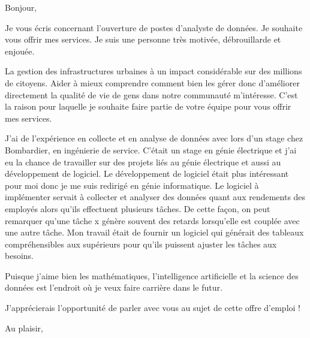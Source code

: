 \documentclass[12pt,french]{letter}
\begin{document}
\pagestyle{headings}

\begin{letter}{}
\address{Montréal, Canada}

\opening{Bonjour,}


Je vous écris concernant l'ouverture de postes d’analyste de données. Je souhaite vous offrir mes services.
Je suis une personne très motivée, débrouillarde et enjouée. 

La gestion des infrastructures urbaines à un impact considérable sur des millions de citoyens. Aider à mieux comprendre comment bien les gérer donc d'améliorer directement la qualité de vie de gens dans notre communauté m'intéresse.  C'est la raison pour laquelle je souhaite faire partie de votre équipe pour vous offrir mes services.

J'ai de l'expérience en collecte et en analyse de données avec lors d'un stage chez Bombardier, en ingénierie de service. C'était un stage en génie électrique et j'ai eu la chance de travailler sur des projets liés au génie électrique et aussi au développement de logiciel. Le développement de logiciel était plus intéressant pour moi donc je me suis redirigé en génie informatique. Le logiciel à implémenter servait à collecter et analyser des données quant aux rendements des employés alors qu'ils effectuent plusieurs tâches. De cette façon, on peut remarquer qu'une tâche x génère souvent des retards lorsqu'elle est couplée avec une autre tâche. Mon travail était de fournir un logiciel qui générait des tableaux compréhensibles aux supérieurs pour qu'ils puissent ajuster les tâches aux besoins. 

Puisque j'aime bien les mathématiques, l'intelligence artificielle et la science des données est l'endroit où je veux faire carrière dans le futur.

J'apprécierais l'opportunité de parler avec vous au sujet de cette offre d'emploi !

\signature{Maxime}

\closing{Au plaisir,}


\end{letter}
\end{document}
